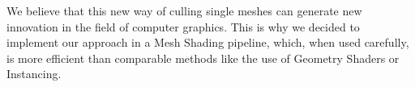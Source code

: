 \noindent
We believe that this new way of culling single meshes can generate new innovation in the field of computer graphics.
This is why we decided to implement our approach in a Mesh Shading pipeline, which, when used carefully, is more 
efficient than comparable methods like the use of Geometry Shaders or Instancing.